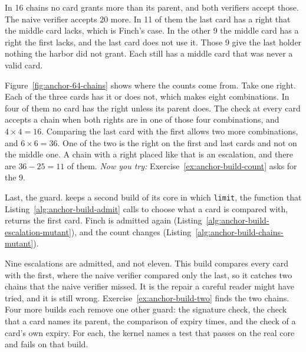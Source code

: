 In 16 chains no card grants more than its parent, and both verifiers
accept those. The naive verifier accepts 20 more. In 11 of them the last
card has a right that the middle card lacks, which is Finch's case. In the
other 9 the middle card has a right the first lacks, and the last card
does not use it. Those 9 give the last holder nothing the harbor did not
grant. Each still has a middle card that was never a valid card.

Figure~\ref{fig:anchor-64-chains} shows where the counts come from.
Take one right. Each of the three cards has it or does not, which makes
eight combinations. In four of them no card has the right unless its parent
does. The check at every card accepts a chain when both rights are in one
of those four combinations, and $4\times4=16$. Comparing the last card with
the first allows two more combinations, and $6\times6=36$. One of the two is
the right on the first and last cards and not on the middle one. A chain
with a right placed like that is an escalation, and there are $36-25=11$ of
them.
\emph{Now you try:} Exercise~\ref{ex:anchor-build-count} asks for the 9.



Last, the guard. \pdkernelname{} keeps a second build of its core in which
\texttt{limit}, the function that Listing~\ref{alg:anchor-build-admit}
calls to choose what a card is compared with, returns the first card.
Finch is admitted again (Listing~\ref{alg:anchor-build-escalation-mutant}),
and the count changes (Listing~\ref{alg:anchor-build-chains-mutant}).



Nine escalations are admitted, and not eleven. This build compares every
card with the first, where the naive verifier compared only the last, so it
catches two chains that the naive verifier missed. It is the repair a
careful reader might have tried, and it is still wrong.
Exercise~\ref{ex:anchor-build-two} finds the two chains. Four more builds
each remove one other guard: the signature check, the check that a card
names its parent, the comparison of expiry times, and the check of a card's
own expiry. For each, the kernel names a test that passes on the real core
and fails on that build.

